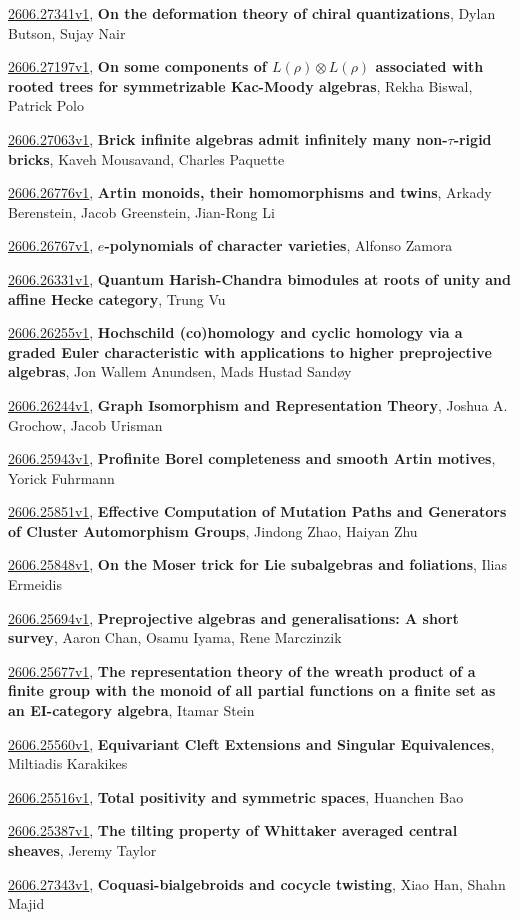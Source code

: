 \documentclass[9pt, a4paper]{article}
\theoremstyle{plain}
\theoremstyle{definition}
\theoremstyle{remark}
\newcommand{\arxiv}[3]{\href{https://arxiv.org/abs/#1}{#1}, \textbf{\textcolor{arxivblue}{#2}}, #3}
\begin{document}
\arxiv{2606.27341v1}{On the deformation theory of chiral quantizations}{Dylan Butson, Sujay Nair}

\arxiv{2606.27197v1}{On some components of $L(ρ)\otimes L(ρ)$ associated with rooted trees for symmetrizable Kac-Moody algebras}{Rekha Biswal, Patrick Polo}

\arxiv{2606.27063v1}{Brick infinite algebras admit infinitely many non-$τ$-rigid bricks}{Kaveh Mousavand, Charles Paquette}

\arxiv{2606.26776v1}{Artin monoids, their homomorphisms and twins}{Arkady Berenstein, Jacob Greenstein, Jian-Rong Li}

\arxiv{2606.26767v1}{$e$-polynomials of character varieties}{Alfonso Zamora}

\arxiv{2606.26331v1}{Quantum Harish-Chandra bimodules at roots of unity and affine Hecke category}{Trung Vu}

\arxiv{2606.26255v1}{Hochschild (co)homology and cyclic homology via a graded Euler characteristic with applications to higher preprojective algebras}{Jon Wallem Anundsen, Mads Hustad Sandøy}

\arxiv{2606.26244v1}{Graph Isomorphism and Representation Theory}{Joshua A. Grochow, Jacob Urisman}

\arxiv{2606.25943v1}{Profinite Borel completeness and smooth Artin motives}{Yorick Fuhrmann}

\arxiv{2606.25851v1}{Effective Computation of Mutation Paths and Generators of Cluster Automorphism Groups}{Jindong Zhao, Haiyan Zhu}

\arxiv{2606.25848v1}{On the Moser trick for Lie subalgebras and foliations}{Ilias Ermeidis}

\arxiv{2606.25694v1}{Preprojective algebras and generalisations: A short survey}{Aaron Chan, Osamu Iyama, Rene Marczinzik}

\arxiv{2606.25677v1}{The representation theory of the wreath product of a finite group with the monoid of all partial functions on a finite set as an EI-category algebra}{Itamar Stein}

\arxiv{2606.25560v1}{Equivariant Cleft Extensions and Singular Equivalences}{Miltiadis Karakikes}

\arxiv{2606.25516v1}{Total positivity and symmetric spaces}{Huanchen Bao}

\arxiv{2606.25387v1}{The tilting property of Whittaker averaged central sheaves}{Jeremy Taylor}

\arxiv{2606.27343v1}{Coquasi-bialgebroids and cocycle twisting}{Xiao Han, Shahn Majid}
\end{document}

